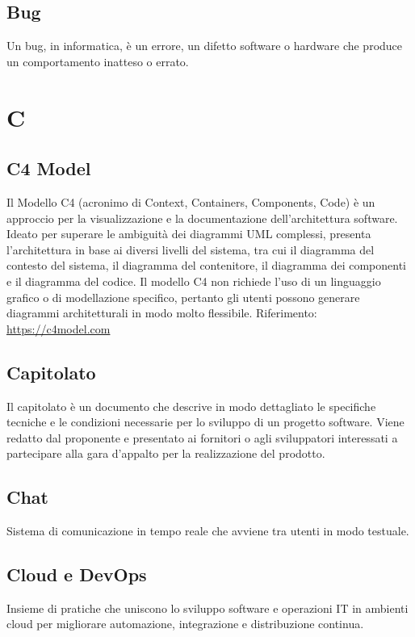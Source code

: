 \documentclass[10pt, letterpaper]{article}
\begin{document}
\subsection*{Bug}
Un bug, in informatica, è un errore, un difetto software o hardware che produce un comportamento inatteso o errato.

\section{C}

\subsection*{C4 Model}
Il Modello C4 (acronimo di Context, Containers, Components, Code) è un approccio per la visualizzazione e la documentazione dell'architettura software. Ideato per
superare le ambiguità dei diagrammi UML complessi, presenta l'architettura in base ai diversi livelli del sistema, tra cui il diagramma del contesto del sistema, il diagramma
del contenitore, il diagramma dei componenti e il diagramma del codice. Il modello C4 non richiede l'uso di un linguaggio grafico o di modellazione specifico, pertanto gli
utenti possono generare diagrammi architetturali in modo molto flessibile. Riferimento: \url{https://c4model.com}

\subsection*{Capitolato}
Il capitolato è un documento che descrive in modo dettagliato le specifiche tecniche e le condizioni necessarie per lo sviluppo di un
progetto software. Viene redatto dal proponente e presentato ai fornitori o agli sviluppatori interessati a partecipare alla gara
d'appalto per la realizzazione del prodotto.

\subsection*{Chat}
Sistema di comunicazione in tempo reale che avviene tra utenti in modo testuale.

\subsection*{Cloud e DevOps}
Insieme di pratiche che uniscono lo sviluppo software e operazioni IT in ambienti cloud per migliorare automazione, integrazione e distribuzione continua.
\end{document}
